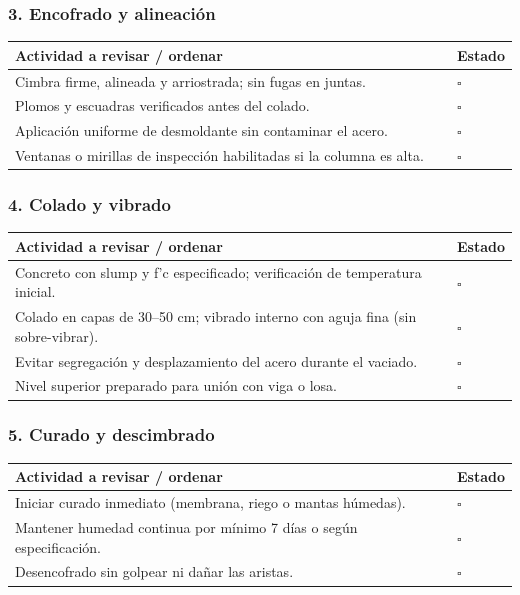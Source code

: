 \documentclass[12pt]{article}
\newcommand{\cbox}{\(\square\)} %
\begin{document}
	\subsubsection*{3. Encofrado y alineación}
	\begin{tabularx}{\linewidth}{>{\raggedright\arraybackslash}p{0.93\linewidth} >{\centering\arraybackslash}m{0.07\linewidth}}
		\toprule
		\textbf{Actividad a revisar / ordenar} & \textbf{Estado}\\
		\midrule
		Cimbra firme, alineada y arriostrada; sin fugas en juntas. & \cbox \\
		Plomos y escuadras verificados antes del colado. & \cbox \\
		Aplicación uniforme de desmoldante sin contaminar el acero. & \cbox \\
		Ventanas o mirillas de inspección habilitadas si la columna es alta. & \cbox \\
		\bottomrule
	\end{tabularx}
	
	\subsubsection*{4. Colado y vibrado}
	\begin{tabularx}{\linewidth}{>{\raggedright\arraybackslash}p{0.93\linewidth} >{\centering\arraybackslash}m{0.07\linewidth}}
		\toprule
		\textbf{Actividad a revisar / ordenar} & \textbf{Estado}\\
		\midrule
		Concreto con slump y f’c especificado; verificación de temperatura inicial. & \cbox \\
		Colado en capas de 30–50 cm; vibrado interno con aguja fina (sin sobre-vibrar). & \cbox \\
		Evitar segregación y desplazamiento del acero durante el vaciado. & \cbox \\
		Nivel superior preparado para unión con viga o losa. & \cbox \\
		\bottomrule
	\end{tabularx}
	
	\subsubsection*{5. Curado y descimbrado}
	\begin{tabularx}{\linewidth}{>{\raggedright\arraybackslash}p{0.93\linewidth} >{\centering\arraybackslash}m{0.07\linewidth}}
		\toprule
		\textbf{Actividad a revisar / ordenar} & \textbf{Estado}\\
		\midrule
		Iniciar curado inmediato (membrana, riego o mantas húmedas). & \cbox \\
		Mantener humedad continua por mínimo 7 días o según especificación. & \cbox \\
		Desencofrado sin golpear ni dañar las aristas. & \cbox \\
		\bottomrule
	\end{tabularx}
	
\end{document}
